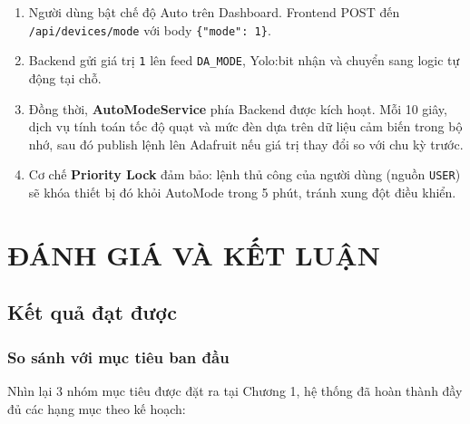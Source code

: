 \begin{enumerate}
    \item Người dùng bật chế độ Auto trên Dashboard. Frontend POST đến \texttt{/api/devices/mode} với body \texttt{\{"mode": 1\}}.
    \item Backend gửi giá trị \texttt{1} lên feed \texttt{DA\_MODE}, Yolo:bit nhận và chuyển sang logic tự động tại chỗ.
    \item Đồng thời, \textbf{AutoModeService} phía Backend được kích hoạt. Mỗi 10 giây, dịch vụ tính toán tốc độ quạt và mức đèn dựa trên dữ liệu cảm biến trong bộ nhớ, sau đó publish lệnh lên Adafruit nếu giá trị thay đổi so với chu kỳ trước.
    \item Cơ chế \textbf{Priority Lock} đảm bảo: lệnh thủ công của người dùng (nguồn \texttt{USER}) sẽ khóa thiết bị đó khỏi AutoMode trong 5 phút, tránh xung đột điều khiển.
\end{enumerate}


\section{ĐÁNH GIÁ VÀ KẾT LUẬN}

\subsection{Kết quả đạt được}

\subsubsection{So sánh với mục tiêu ban đầu}

Nhìn lại 3 nhóm mục tiêu được đặt ra tại Chương 1, hệ thống đã hoàn thành đầy đủ các hạng mục theo kế hoạch:


